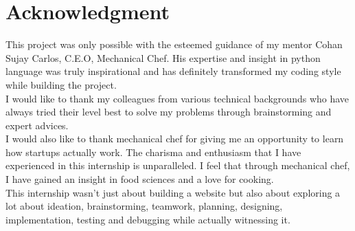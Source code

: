 \cleardoublepage
{}
{}
\chapter*{Acknowledgment}
This project was only possible with the esteemed guidance of my mentor Cohan Sujay Carlos, C.E.O, Mechanical Chef. His expertise and insight in python language was truly inspirational and has definitely transformed my coding style while building the project. \\[0.1in] 
I would like to thank my colleagues from various technical backgrounds who have always tried their level best to solve my problems through brainstorming and expert advices. \\[0.1in]
I would also like to thank mechanical chef for giving me an opportunity to learn how startups actually work. The charisma and enthusiasm that I have experienced in this internship is unparalleled. I feel that through mechanical chef, I have gained an insight in food sciences and a love for cooking.\\[0.1in]
This internship wasn't just about building a website but also about exploring a lot about ideation, brainstorming, teamwork, planning, designing, implementation, testing and debugging while actually witnessing it. 